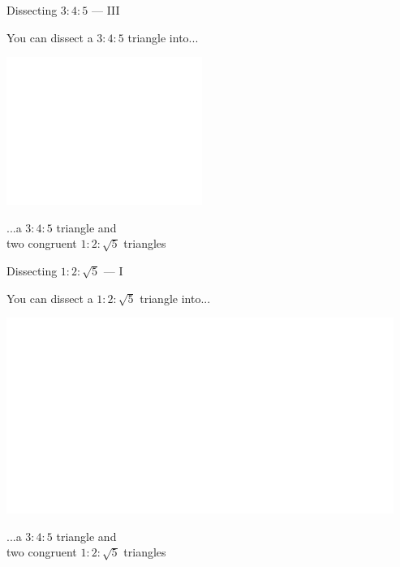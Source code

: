 \documentclass[14pt]{beamer}
\begin{document}

    \begin{frame}{Dissecting $3\!\!:\!\!4\!\!:\!\!5$ --- III}
        \begin{center}
            You can dissect a $3\!\!:\!\!4\!\!:\!\!5$ triangle into...

            \bigskip \bigskip

            \includegraphics[height=18ex]{figures/figure006d.pdf}

            \bigskip \bigskip

            ...a $3\!\!:\!\!4\!\!:\!\!5$ triangle and\\two congruent $1\!\!:\!\!2\!\!:\!\!\sqrt{5}$ triangles
        \end{center}
    \end{frame}


    \begin{frame}{Dissecting $1\!\!:\!\!2\!\!:\!\!\sqrt{5}$ --- I}
        \begin{center}
            You can dissect a $1\!\!:\!\!2\!\!:\!\!\sqrt{5}$ triangle into...

            \bigskip \bigskip

            \includegraphics[height=18ex]{figures/figure006e.pdf}

            \bigskip \bigskip

            ...a $3\!\!:\!\!4\!\!:\!\!5$ triangle and\\two congruent $1\!\!:\!\!2\!\!:\!\!\sqrt{5}$ triangles
        \end{center}
    \end{frame}
\end{document}

